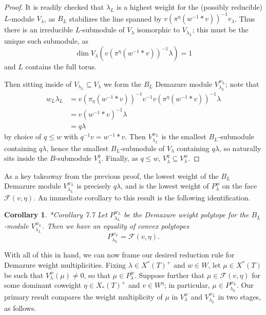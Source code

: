 \documentclass[12pt,reqno]{amsart}
\newtheorem{corollary}[theorem]{Corollary}
\theoremstyle{definition}
\begin{document}
\begin{proof}
It is readily checked that $\lambda_L$ is a highest weight for the (possibly reducible) $L$-module $V_\lambda$, as $B_L$ stabilizes the line spanned by $v\left(\pi^\eta(w^{-1}\ast v) \right)^{-1} v_\lambda$. Thus there is an irreducible $L$-submodule of $V_\lambda$ isomorphic to $V_{\lambda_L}$; this must be the unique such submodule, as $$\dim V_\lambda(v\left(\pi^\eta(w^{-1}\ast v) \right)^{-1} \lambda) = 1$$ and $L$ contains the full torus. 

Then sitting inside of $V_{\lambda_L} \subseteq V_\lambda$ we form the $B_L$ Demazure module $V_{\lambda_L}^{w_L}$; note that 
$$
\begin{aligned}
w_L \lambda_L &= v \left(\pi_\eta(w^{-1} \ast v) \right)^{-1} v^{-1} v \left( \pi^\eta( w^{-1} \ast v) \right)^{-1} \lambda \\
&= v(w^{-1} \ast v)^{-1}\lambda \\
&= q\lambda
\end{aligned}
$$
by choice of $q \leq w$ with $q^{-1}v=w^{-1} \ast v$. Then $V^{w_L}_{\lambda_L}$ is the smallest $B_L$-submodule containing $q\lambda$, hence the smallest $B_L$-submodule of $V_\lambda$ containing $q\lambda$, so naturally sits inside the $B$-submodule $V^q_\lambda$. Finally, as $q \leq w$, $V^q_\lambda \subseteq V^w_\lambda$. 
\end{proof}

As a key takeaway from the previous proof, the lowest weight of the $B_L$ Demazure module $V^{w_L}_{\lambda_L}$ is precisely $q\lambda$, and is the lowest weight of $P^w_\lambda$ on the face $\mathcal{F}(v,\eta)$. An immediate corollary to this result is the following identification. 

\begin{corollary}{\cite{BJK2}*{Corollary 7.7}}
Let $P_{\lambda_L}^{w_L}$ be the Demazure weight polytope for the $B_L$-module $V^{w_L}_{\lambda_L}$. Then we have an equality of convex polytopes
$$
P_{\lambda_L}^{w_L} = \mathcal{F}(v, \eta).
$$
\end{corollary}

With all of this in hand, we can now frame our desired reduction rule for Demazure weight multiplicities. Fixing $\lambda \in X^\ast(T)^+$ and $w \in W$, let $\mu \in X^\ast(T)$ be such that $V^w_\lambda(\mu) \neq 0$, so that $\mu \in P^w_\lambda$. Suppose further that $\mu \in \mathcal{F}(v,\eta)$ for some dominant coweight $\eta \in X_\ast(T)^+$ and $v \in W^\eta$; in particular, $\mu \in P^{w_L}_{\lambda_L}$. Our primary result compares the weight multiplicity of $\mu$ in $V^w_\lambda$ and $V^{w_L}_{\lambda_L}$ in two stages, as follows. 
\end{document}

